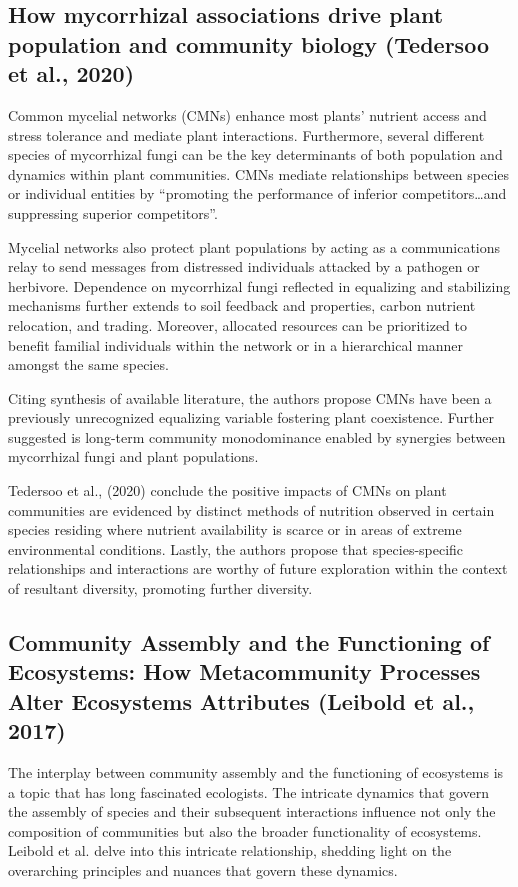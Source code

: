\documentclass[sn-nature]{sn-jnl}%
\theoremstyle{thmstyleone}%
\theoremstyle{thmstyletwo}%
\theoremstyle{thmstylethree}%
\begin{document}
\subsection{How mycorrhizal associations drive plant population and community biology (Tedersoo et al., 2020)\cite{tedersoo_how_2020}}
Common mycelial networks (CMNs) enhance most plants' nutrient access and stress tolerance and mediate plant interactions. Furthermore, several different species of mycorrhizal fungi can be the key determinants of both population and dynamics within plant communities. CMNs mediate relationships between species or individual entities by “promoting the performance of inferior competitors…and suppressing superior competitors”\cite{tedersoo_how_2020}.

Mycelial networks also protect plant populations by acting as a communications relay to send messages from distressed individuals attacked by a pathogen or herbivore. Dependence on mycorrhizal fungi reflected in equalizing and stabilizing mechanisms further extends to soil feedback and properties, carbon nutrient relocation, and trading. Moreover, allocated resources can be prioritized to benefit familial individuals within the network or in a hierarchical manner amongst the same species\cite{tedersoo_how_2020}.

Citing synthesis of available literature, the authors propose CMNs have been a previously unrecognized equalizing variable fostering plant coexistence. Further suggested is long-term community monodominance enabled by synergies between mycorrhizal fungi and plant populations\cite{tedersoo_how_2020}.

Tedersoo et al., (2020) conclude the positive impacts of CMNs on plant communities are evidenced by distinct methods of nutrition observed in certain species residing where nutrient availability is scarce or in areas of extreme environmental conditions. Lastly, the authors propose that species-specific relationships and interactions are worthy of future exploration within the context of resultant diversity, promoting further diversity\cite{tedersoo_how_2020}.

\subsection{Community Assembly and the Functioning of Ecosystems: How Metacommunity Processes Alter Ecosystems Attributes (Leibold et al., 2017)\cite{leibold_community_2017}}

The interplay between community assembly and the functioning of ecosystems is a topic that has long fascinated ecologists. The intricate dynamics that govern the assembly of species and their subsequent interactions influence not only the composition of communities but also the broader functionality of ecosystems. Leibold et al. delve into this intricate relationship, shedding light on the overarching principles and nuances that govern these dynamics.
\end{document}
